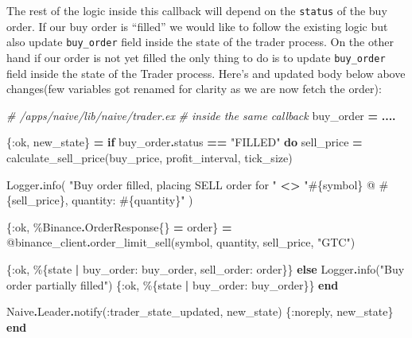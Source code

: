 \documentclass[
  oneside]{book}
\newenvironment{Shaded}{\begin{snugshade}}{\end{snugshade}}
\newcommand{\CommentTok}[1]{\textcolor[rgb]{0.56,0.35,0.01}{\textit{#1}}}
\newcommand{\ConstantTok}[1]{\textcolor[rgb]{0.00,0.00,0.00}{#1}}
\newcommand{\ControlFlowTok}[1]{\textcolor[rgb]{0.13,0.29,0.53}{\textbf{#1}}}
\newcommand{\KeywordTok}[1]{\textcolor[rgb]{0.13,0.29,0.53}{\textbf{#1}}}
\newcommand{\NormalTok}[1]{#1}
\newcommand{\OperatorTok}[1]{\textcolor[rgb]{0.81,0.36,0.00}{\textbf{#1}}}
\newcommand{\OtherTok}[1]{\textcolor[rgb]{0.56,0.35,0.01}{#1}}
\newcommand{\StringTok}[1]{\textcolor[rgb]{0.31,0.60,0.02}{#1}}
\newcommand{\VariableTok}[1]{\textcolor[rgb]{0.00,0.00,0.00}{#1}}
\begin{document}
The rest of the logic inside this callback will depend on the \texttt{status} of the buy order. If our buy order is ``filled'' we would like to follow the existing logic but also update \texttt{buy\_order} field inside the state of the trader process. On the other hand if our order is not yet filled the only thing to do is to update \texttt{buy\_order} field inside the state of the Trader process. Here's and updated body below above changes(few variables got renamed for clarity as we are now fetch the order):

\begin{Shaded}
\begin{Highlighting}[]
  \CommentTok{\# /apps/naive/lib/naive/trader.ex}
  \CommentTok{\# inside the same callback}
\NormalTok{  buy\_order }\OperatorTok{=} \OperatorTok{....}

\NormalTok{    \{}\VariableTok{:ok}\NormalTok{, new\_state\} }\OperatorTok{=}
      \ControlFlowTok{if}\NormalTok{ buy\_order}\OperatorTok{.}\NormalTok{status }\OperatorTok{==} \StringTok{"FILLED"} \KeywordTok{do}
\NormalTok{        sell\_price }\OperatorTok{=}\NormalTok{ calculate\_sell\_price(buy\_price, profit\_interval, tick\_size)}

        \ConstantTok{Logger}\OperatorTok{.}\NormalTok{info(}
          \StringTok{"Buy order filled, placing SELL order for "} \OperatorTok{\textless{}\textgreater{}}
            \StringTok{"}\OtherTok{\#\{}\NormalTok{symbol}\OtherTok{\}}\StringTok{ @ }\OtherTok{\#\{}\NormalTok{sell\_price}\OtherTok{\}}\StringTok{, quantity: }\OtherTok{\#\{}\NormalTok{quantity}\OtherTok{\}}\StringTok{"}
\NormalTok{        )}

\NormalTok{        \{}\VariableTok{:ok}\NormalTok{, \%}\ConstantTok{Binance}\OperatorTok{.}\ConstantTok{OrderResponse}\NormalTok{\{\} }\OperatorTok{=}\NormalTok{ order\} }\OperatorTok{=}
          \OtherTok{@binance\_client}\OperatorTok{.}\NormalTok{order\_limit\_sell(symbol, quantity, sell\_price, }\StringTok{"GTC"}\NormalTok{)}

\NormalTok{        \{}\VariableTok{:ok}\NormalTok{, \%\{state }\OperatorTok{|} \VariableTok{buy\_order:}\NormalTok{ buy\_order, }\VariableTok{sell\_order:}\NormalTok{ order\}\}}
      \ControlFlowTok{else}
        \ConstantTok{Logger}\OperatorTok{.}\NormalTok{info(}\StringTok{"Buy order partially filled"}\NormalTok{)}
\NormalTok{        \{}\VariableTok{:ok}\NormalTok{, \%\{state }\OperatorTok{|} \VariableTok{buy\_order:}\NormalTok{ buy\_order\}\}}
      \KeywordTok{end}

    \ConstantTok{Naive}\OperatorTok{.}\ConstantTok{Leader}\OperatorTok{.}\NormalTok{notify(}\VariableTok{:trader\_state\_updated}\NormalTok{, new\_state)}
\NormalTok{    \{}\VariableTok{:noreply}\NormalTok{, new\_state\}}
  \KeywordTok{end}
\end{Highlighting}
\end{Shaded}
\end{document}
